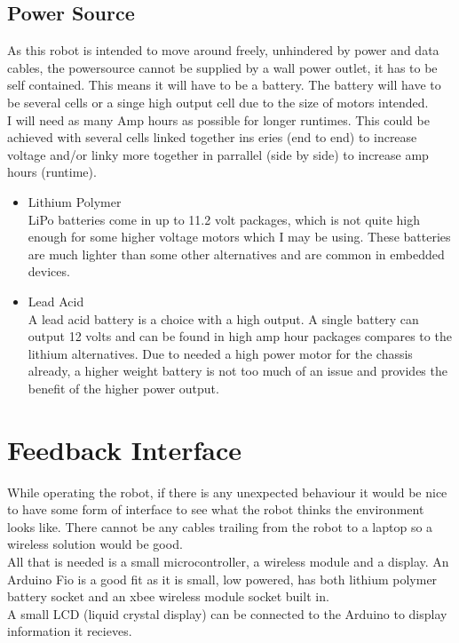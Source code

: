 \subsection{Power Source}
As this robot is intended to move around freely, unhindered by power and data cables, the powersource cannot be supplied by a wall power outlet, it has to be self contained.  This means it will have to be a battery.  The battery will have to be several cells or a singe high output cell due to the size of motors intended.
\\I will need as many Amp hours as possible for longer runtimes.  This could be achieved with several cells linked together ins eries (end to end) to increase voltage and/or linky more together in parrallel (side by side) to increase amp hours (runtime).
\begin{itemize}
\item Lithium Polymer
\\LiPo batteries come in up to 11.2 volt packages, which is not quite high enough for some higher voltage motors which I may be using.  These batteries are much lighter than some other alternatives and are common in embedded devices.

\item Lead Acid
\\A lead acid battery is a choice with a high output.  A single battery can output 12 volts and can be found in high amp hour packages compares to the lithium alternatives.  Due to needed a high power motor for the chassis already, a higher weight battery is not too much of an issue and provides the benefit of the higher power output.
\end{itemize}

\section{Feedback Interface}
While operating the robot, if there is any unexpected behaviour it would be nice to have some form of interface to see what the robot thinks the environment looks like.  There cannot be any cables trailing from the robot to a laptop so a wireless solution would be good.
\\All that is needed is a small microcontroller, a wireless module and a display.
An Arduino Fio is a good fit as it is small, low powered, has both lithium polymer battery socket and an xbee wireless module socket built in.
\\A small LCD (liquid crystal display) can be connected to the Arduino to display information it recieves.

